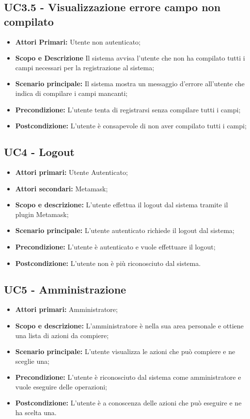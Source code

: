 \documentclass[AnalisiDeiRequisiti.tex]{subfiles}
\begin{document}
\subsection{UC3.5 - Visualizzazione errore campo non compilato}
\begin{itemize}
	\item \textbf{Attori Primari:} Utente non autenticato;
	\item \textbf{Scopo e Descrizione} Il sistema avvisa l'utente che non ha compilato tutti i campi necessari per la registrazione al sistema;
	\item \textbf{Scenario principale:} Il sistema mostra un messaggio d'errore all'utente che indica di compilare i campi mancanti;
	\item \textbf{Precondizione:} L'utente tenta di registrarsi senza compilare tutti i campi;
	\item \textbf{Postcondizione:} L'utente è consapevole di non aver compilato tutti i campi;
\end{itemize}
\subsection{UC4 - Logout}
\begin{itemize}
	\item \textbf{Attori primari:} Utente Autenticato;
	\item \textbf{Attori secondari:} Metamask;
	\item \textbf{Scopo e descrizione:} L'utente effettua il logout dal sistema tramite il plugin Metamask;
	\item \textbf{Scenario principale:} L'utente autenticato richiede il logout dal sistema;
	\item \textbf{Precondizione:} L'utente è autenticato e vuole effettuare il logout;
	\item \textbf{Postcondizione:} L'utente non è più riconosciuto dal sistema.
\end{itemize}
\subsection{UC5 - Amministrazione}
\begin{itemize}
	\item \textbf{Attori primari:} Amministratore;
	\item \textbf{Scopo e descrizione:} L'amministratore è nella sua area personale e ottiene una lista di azioni da compiere;
	\item \textbf{Scenario principale:} L'utente visualizza le azioni che può compiere e ne sceglie una; 
	\item \textbf{Precondizione:} L'utente è riconosciuto dal sistema come amministratore e vuole eseguire delle operazioni; 
	\item \textbf{Postcondizione:} L'utente è a conoscenza delle azioni che può eseguire e ne ha scelta una.
\end{itemize}
\end{document}
